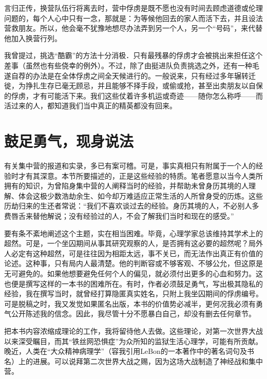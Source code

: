 \documentclass[11pt,oneside]{book}
\begin{document}
\begin{common-format}
言归正传，换营队伍行将离去时，营中俘虏是既不愿也没有时间去顾虑道德或伦理问题的，每个人心中只有一念，那就是：为等候他回去的家人而活下去，并且设法营救朋友。所以，他会毫不犹豫地想尽办法弄到另一个人，另一个“号码”，来代替他加入换营行列。

我曾提过，挑选“酷霸”的方法十分消极．只有最残暴的俘虏才会被挑出来担任这个差事（虽然也有些侥幸的例外）。不过，除了由挺进队负责挑选之外，还有一种毛遂自荐的办法是在全体俘虏之间全天候进行的。一般说来，只有经过多年辗转迁徙，为挣扎生存已毫无顾忌，并且能够不择手段，或偷或抢，甚至出卖朋友以自保的俘虏，才有可能活下来。我们这些仗着许多机运或奇迹——随你怎么称呼——而活过来的人，都知道我们当中真正的精英都没有回来。

\section{鼓足勇气，现身说法}
有关集中营的报道和实录，多已有案可稽。可是，事实真相只有附属于一个人的经验时才有其深意。本节所要描述的，正是这些经验的特质。笔者愿意以当今人类所拥有的知识，为曾陷身集中营的人阐释当时的经验，并帮助未曾身历其境的人理解、体会这极少数浩劫余生、如今却万难适应正常生活的人所曾身受的历炼。这些历劫归来的生还者常说：“我们不喜欢谈过去的经验。身历其境的人，不必别人多费唇舌来替他解说；没有经验过的人，不会了解我们当时和现在的感受。”

要有条不紊地阐述这个主题，实在相当困难。毕竟，心理学家总该维持其学术上的超然。可是，一个坐囚期间从事其研究观察的人，是否拥有这必要的超然呢？局外人必定有这种超然，可是往往因为相距太远，事不关已，而无法作出真正有价值的论述。这种事，只有局内人最清楚。他的判断容或不够客观、不够公允，但这原是无可避免的。如果他想要避免任何个人的偏见，就必须付出更多的心血和努力。这也便是撰写这样的一本书的困难所在。有时，作者必须鼓足勇气，写出极其隐私的经验，我在撰写当时，就曾经打算隐匿真实姓名，只附上我坐囚期间的俘虏编号。可是脱稿之时，我又发觉如果匿名出版，本书的价值势必减半，更何况我必须有勇气公开陈述我的信念。因此，我尽管十分不愿暴白自己，却没有删去任何章节。

把本书内容浓缩成理论的工作，我将留待他人去做。这些理论，对第一次世界大战以来深受瞩目，而其“铁丝网恐惧症”为众所知的监狱生活心理学，可能有所贡献。晚近，人类在“大众精神病理学”（容我引用LeBon的一本著作中的著名词句及书名）上的进展。可以说拜第二次世界大战之赐，因为这场大战制造了神经战和集中营。


\end{common-format}
\end{document}
